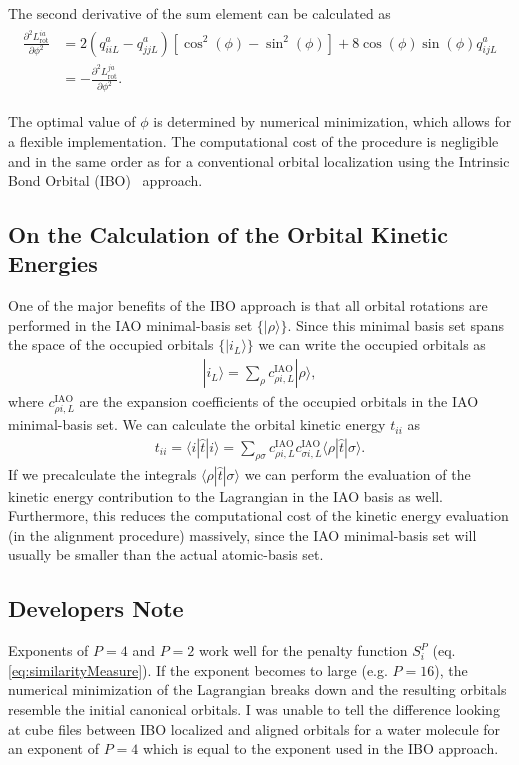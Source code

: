 The second derivative of the sum element can be calculated as
\begin{align}
  \begin{split}
    \frac{\partial^2 L_\mathrm{rot}^{ia}}{\partial \phi^2}
     &= 2(q_{iiL}^a-q_{jjL}^a)\left[\cos^2(\phi)-\sin^2(\phi)\right]+8\cos(\phi)\sin(\phi)q_{ijL}^a\\
     &= -\frac{\partial^2 L_\mathrm{rot}^{ja}}{\partial \phi^2}.
  \end{split}
\end{align}

The optimal value of $\phi$ is determined by numerical minimization, which allows for a flexible implementation.
The computational cost of the procedure is negligible and in the same order as for a conventional orbital
localization using the Intrinsic Bond Orbital (IBO)~\cite{Knizia2013} approach.

\subsection{On the Calculation of the Orbital Kinetic Energies}

One of the major benefits of the IBO approach is that all orbital rotations are performed in the IAO
minimal-basis set $\{|\rho\rangle\}$. Since this minimal basis set spans the space of the occupied orbitals
$\{|i_L\rangle\}$ we can write the occupied orbitals as
\begin{align}
  |i_L\rangle = \sum_\rho c^{\mathrm{IAO}}_{\rho i,L} |\rho\rangle,
\end{align}
where $c^{\mathrm{IAO}}_{\rho i,L}$ are the expansion coefficients of the occupied orbitals in the IAO
minimal-basis set. We can calculate the orbital kinetic energy $t_{ii}$ as
\begin{align}
  t_{ii}=\langle i | \hat{t}| i \rangle =
   \sum_{\rho \sigma} c^\mathrm{IAO}_{\rho i,L} c^\mathrm{IAO}_{\sigma i,L} \langle \rho |\hat{t}|\sigma\rangle.
\end{align}
If we precalculate the integrals $\langle \rho |\hat{t}|\sigma\rangle$ we can perform the evaluation of the
kinetic energy contribution to the Lagrangian in the IAO basis as well. Furthermore, this reduces the computational
cost of the kinetic energy evaluation (in the alignment procedure) massively, since the IAO minimal-basis set will
usually be smaller than the actual atomic-basis set.

\subsection{Developers Note}
Exponents of $P=4$ and $P=2$ work well for the penalty function $S_{i}^P$ (eq. \ref{eq:similarityMeasure}). If the exponent becomes to large (e.g. $P=16$), the numerical
minimization of the Lagrangian breaks down and the resulting orbitals resemble the initial canonical
orbitals. I was unable to tell the difference looking at cube files between IBO localized and aligned
orbitals for a water molecule for an exponent of $P=4$ which is equal to the exponent used in the IBO approach.
